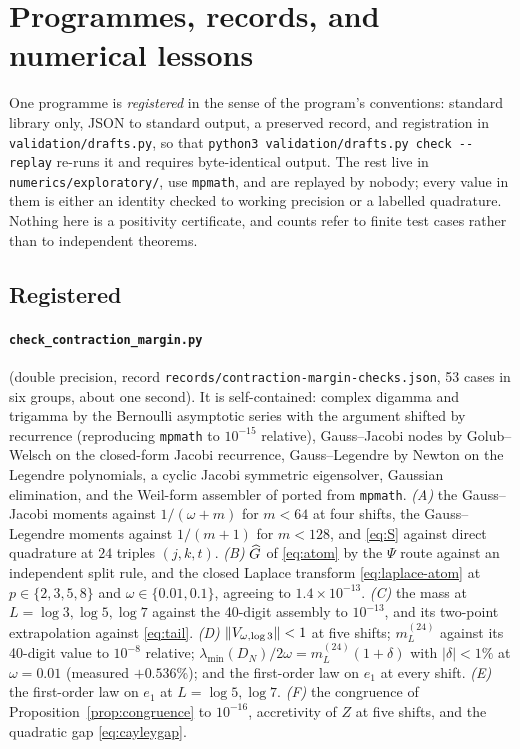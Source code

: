 \section{Programmes, records, and numerical lessons}\label{app:numerics}

One programme is \emph{registered} in the sense of the program's conventions:
standard library only, JSON to standard output, a preserved record, and
registration in \texttt{validation/drafts.py}, so that
\texttt{python3 validation/drafts.py check -{}-replay} re-runs it and requires
byte-identical output. The rest live in \texttt{numerics/exploratory/}, use
\texttt{mpmath}, and are replayed by nobody; every value in them is either an
identity checked to working precision or a labelled quadrature. Nothing here is
a positivity certificate, and counts refer to finite test cases rather than to
independent theorems.

\subsection*{Registered}

\paragraph{\texttt{check\_contraction\_margin.py}} (double precision, record
\texttt{records/\allowbreak contraction-\allowbreak margin-\allowbreak checks.json}, 53 cases in six
groups, about one second). It is self-contained: complex digamma and trigamma
by the Bernoulli asymptotic series with the argument shifted by recurrence
(reproducing \texttt{mpmath} to $10^{-15}$ relative), Gauss--Jacobi nodes by
Golub--Welsch on the closed-form Jacobi recurrence, Gauss--Legendre by Newton on
the Legendre polynomials, a cyclic Jacobi symmetric eigensolver, Gaussian
elimination, and the Weil-form assembler of \cite{FrameBound} ported from
\texttt{mpmath}. \emph{(A)} the Gauss--Jacobi moments against $1/(\omega+m)$ for
$m<64$ at four shifts, the Gauss--Legendre moments against $1/(m+1)$ for
$m<128$, and \eqref{eq:S} against direct quadrature at $24$ triples $(j,k,t)$.
\emph{(B)} $\widehat G$ of \eqref{eq:atom} by the $\Psi$ route against an independent
split rule, and the closed Laplace transform \eqref{eq:laplace-atom} at
$p\in\{2,3,5,8\}$ and $\omega\in\{0.01,0.1\}$, agreeing to $1.4\times10^{-13}$.
\emph{(C)} the mass at $L=\log3,\log5,\log7$ against the 40-digit assembly to
$10^{-13}$, and its two-point extrapolation against \eqref{eq:tail}.
\emph{(D)} $\lVert V_{\omega,\log3}\rVert<1$ at five shifts; $m_L^{(24)}$ against its
40-digit value to $10^{-8}$ relative; $\lambda_{\min}(D_N)/2\omega=m_L^{(24)}(1+\delta)$
with $|\delta|<1\%$ at $\omega=0.01$ (measured $+0.536\%$); and the first-order
law on $e_1$ at every shift. \emph{(E)} the first-order law on $e_1$ at
$L=\log5,\log7$. \emph{(F)} the congruence of
Proposition~\ref{prop:congruence} to $10^{-16}$, accretivity of $Z$ at five
shifts, and the quadratic gap \eqref{eq:cayleygap}.

